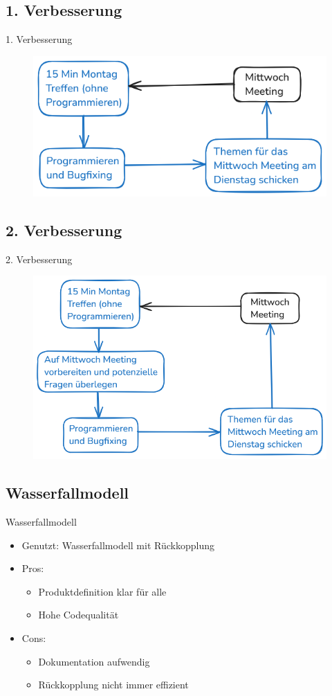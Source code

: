 \subsection{1. Verbesserung}
\begin{frame}{1. Verbesserung}
    \begin{figure}
        \centering
        \includegraphics[width=0.6\linewidth]{pictures/level2}
        \label{fig:lvl2}
    \end{figure}
\end{frame}

\subsection{2. Verbesserung}
\begin{frame}{2. Verbesserung}
    \begin{figure}
        \centering
        \includegraphics[width=0.6\linewidth]{pictures/level3}
        \label{fig:lvl3}
    \end{figure}
\end{frame}

\subsection{Wasserfallmodell}
\begin{frame}{Wasserfallmodell}
    \begin{itemize}
        \item Genutzt: Wasserfallmodell mit Rückkopplung
        \item Pros:
        \begin{itemize}
            \item Produktdefinition klar für alle
            \item Hohe Codequalität
        \end{itemize}
        \item Cons:
        \begin{itemize}
            \item Dokumentation aufwendig
            \item Rückkopplung nicht immer effizient
        \end{itemize}
    \end{itemize}
\end{frame}
